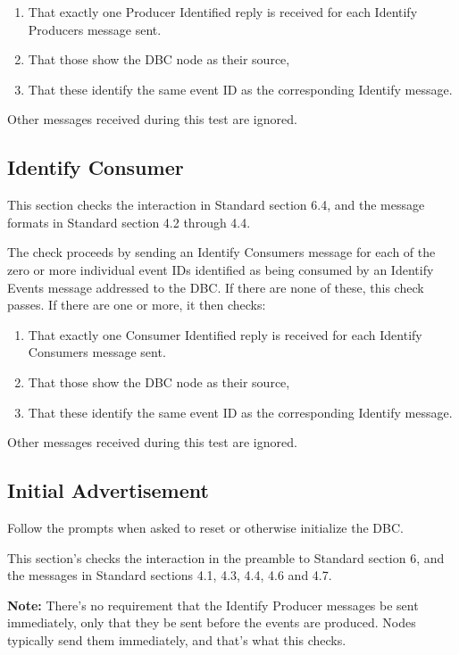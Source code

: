 \begin{enumerate}
\item That exactly one Producer Identified reply is received
    for each Identify Producers message sent.
\item That those show the DBC node as their source,
\item That these identify the same event ID as the corresponding Identify message.
\end{enumerate}

Other messages received during this test are ignored.

\subsection{Identify Consumer}

This section checks the interaction in Standard section 6.4, and
the message formats in Standard section 4.2 through 4.4.

The check proceeds by sending an Identify Consumers message for each of
the zero or more individual event IDs identified as being consumed by an Identify Events message 
addressed to the DBC. If there are none of these, this check passes. If there
are one or more, it then checks:

\begin{enumerate}
\item That exactly one Consumer Identified reply is received 
    for each Identify Consumers message sent.
\item That those show the DBC node as their source,
\item That these identify the same event ID as the corresponding Identify message.
\end{enumerate}

Other messages received during this 
test are ignored.

\subsection{Initial Advertisement}

Follow the prompts when asked to reset or otherwise initialize the DBC.

This section's checks the interaction in the preamble to Standard section 6, and
the messages in Standard sections 4.1, 4.3, 4.4, 4.6 and 4.7.

\textbf{Note:}  There's no requirement that the Identify Producer messages
be sent immediately, only that they be sent before the events are produced.
Nodes typically send them immediately, and that's what this checks.

